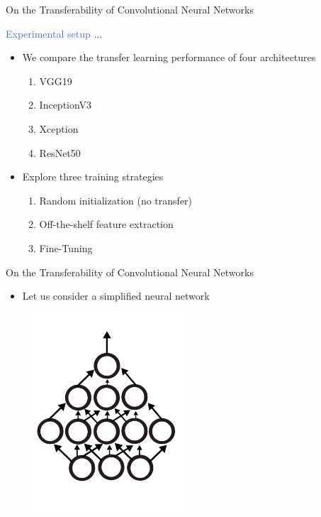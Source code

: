 \documentclass{beamer}
\begin{document}
\begin{frame}{On the Transferability of Convolutional Neural Networks}

	\textcolor{RoyalBlue}{Experimental setup} ...
	\bigskip

	\begin{itemize}
		\item We compare the transfer learning performance of four architectures 
			\begin{enumerate}
				\item VGG19
				\item InceptionV3
				\item Xception
				\item ResNet50
			\end{enumerate}
	\end{itemize}
	\begin{itemize}
		\item Explore three training strategies
			\begin{enumerate}
				\item Random initialization (no transfer)
				\item Off-the-shelf feature extraction
				\item Fine-Tuning
			\end{enumerate}
	\end{itemize}

\end{frame}

\begin{frame}{On the Transferability of Convolutional Neural Networks}
	
	\bigskip

	\begin{itemize}
		\item Let us consider a simplified neural network
	\end{itemize}

	\bigskip

	\begin{figure}
		\includegraphics[width=0.5\textwidth]{figures/mlp.pdf}
	\end{figure}

\end{frame}
\end{document}
